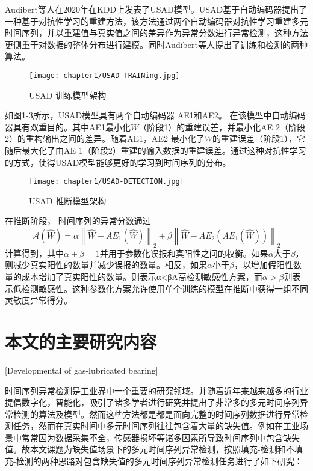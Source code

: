 Audibert等人\cite{usad}在2020年在KDD上发表了USAD模型。USAD基于自动编码器提出了一种基于对抗性学习的重建方法，该方法通过两个自动编码器对抗性学习重建多元时间序列，并以重建值与真实值之间的差异作为异常分数进行异常检测，这种方法更侧重于对数据的整体分布进行建模。同时Audibert等人提出了训练和检测的两种算法。
\begin{figure}[ht]
    \centering
    \texttt{[image: chapter1/USAD-TRAINing.jpg]}
    \caption{USAD 训练模型架构\cite{usad}}
    \end{figure}
如图1-3所示，USAD模型具有两个自动编码器 AE1和AE2。 在该模型中自动编码器具有双重目的。其中AE1最小化$W$（阶段1）的重建误差，并最小化AE 2（阶段2）的重构输出之间的差异。随着AE1，AE2 最小化了$W$的重建误差（阶段1），它随后最大化了由AE 1（阶段2）重建的输入数据的重建误差。通过这种对抗性学习的方式，使得USAD模型能够更好的学习到时间序列的分布。
\begin{figure}[ht]
    \centering
    \texttt{[image: chapter1/USAD-DETECTION.jpg]}
    \caption{USAD 推断模型架构\cite{usad}}
    \end{figure}
在推断阶段， 时间序列的异常分数通过
\begin{equation}
    \mathscr{A}(\widehat{W})=\alpha\left\|\widehat{W}-A E_1(\widehat{W})\right\|_2+\beta\left\|\widehat{W}-A E_2\left(A E_1(\widehat{W})\right)\right\|_2
    \end{equation}
计算得到，其中$\alpha + \beta = 1$并用于参数化误报和真阳性之间的权衡。如果$\alpha$大于$\beta$，则减少真实阳性的数量并减少误报的数量。相反，如果$\alpha$小于$\beta$，以增加假阳性数量的成本增加了真实阳性的数量。则表示α<βA高检测敏感性方案，而$\alpha > \beta$则表示低检测敏感性。这种参数化方案允许使用单个训练的模型在推断中获得一组不同灵敏度异常得分。

\section{本文的主要研究内容}[Developmental of gas-lubricated bearing]

时间序列异常检测是工业界中一个重要的研究领域。并随着近年来越来越多的行业提倡数字化，智能化，吸引了诸多学者进行研究并提出了非常多的多元时间序列异常检测的算法及模型。然而这些方法都是都是面向完整的时间序列数据进行异常检测任务，然而在真实时间中多元时间序列往往包含着大量的缺失值。例如在工业场景中常常因为数据采集不全，传感器损坏等诸多因素所导致时间序列中包含缺失值。故本文课题为缺失值场景下的多元时间序列异常检测，按照填充-检测和不填充-检测的两种思路对包含缺失值的多元时间序列异常检测任务进行了如下研究：

